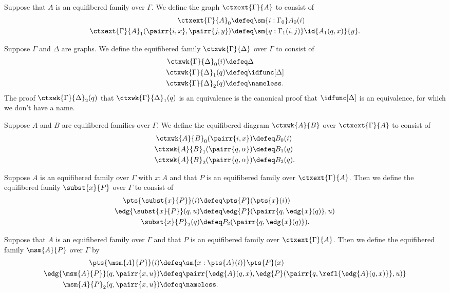 \begin{defn}
Suppose that $A$ is an equifibered family over $\Gamma$. We define the graph
$\ctxext{\Gamma}{A}$ to consist of
\begin{align*}
\ctxext{\Gamma}{A}_0 & \defeq\sm{i:\Gamma_0}A_0(i)\\
\ctxext{\Gamma}{A}_1(\pairr{i,x},\pairr{j,y}) & \defeq \sm{q:\Gamma_1(i,j)}\id{A_1(q,x)}{y}.
\end{align*}
\end{defn}

\begin{defn}
Suppose $\Gamma$ and $\Delta$ are graphs. We define the equifibered family
$\ctxwk{\Gamma}{\Delta}$ over $\Gamma$ to consist of
\begin{align*}
\ctxwk{\Gamma}{\Delta}_0(i) & \defeq \Delta\\
\ctxwk{\Gamma}{\Delta}_1(q) & \defeq \idfunc[\Delta]\\
\ctxwk{\Gamma}{\Delta}_2(q) & \defeq \nameless.
\end{align*}
The proof $\ctxwk{\Gamma}{\Delta}_2(q)$ that $\ctxwk{\Gamma}{\Delta}_1(q)$ is an
equivalence is the canonical proof that $\idfunc[\Delta]$ is an equivalence, for
which we don't have a name.
\end{defn}

\begin{defn}
Suppose $A$ and $B$ are equifibered families over $\Gamma$. We define the equifibered
diagram $\ctxwk{A}{B}$ over $\ctxext{\Gamma}{A}$ to consist of
\begin{align*}
\ctxwk{A}{B}_0(\pairr{i,x}) & \defeq B_0(i)\\
\ctxwk{A}{B}_1(\pairr{q,\alpha}) & \defeq B_1(q)\\
\ctxwk{A}{B}_2(\pairr{q,\alpha}) & \defeq B_2(q).
\end{align*}
\end{defn}

\begin{defn}
Suppose $A$ is an equifibered family over $\Gamma$ with $x:A$ and that $P$ is an equifibered
family over $\ctxext{\Gamma}{A}$. Then we define the equifibered family $\subst{x}{P}$
over $\Gamma$ to consist of
\begin{align*}
\pts{\subst{x}{P}}(i) & \defeq \pts{P}(\pts{x}(i))\\
\edg{\subst{x}{P}}(q,u) & \defeq \edg{P}(\pairr{q,\edg{x}(q)},u)\\
\subst{x}{P}_2(q) & \defeq P_2(\pairr{q,\edg{x}(q)}).
\end{align*}
\end{defn}

\begin{defn}
Suppose that $A$ is an equifibered family over $\Gamma$ and that $P$ is an
equifibered family over $\ctxext{\Gamma}{A}$. Then we define the equifibered
family $\msm{A}{P}$ over $\Gamma$ by
\begin{align*}
\pts{\msm{A}{P}}(i) & \defeq \sm{x:\pts{A}(i)}\pts{P}(x)\\
\edg{\msm{A}{P}}(q,\pairr{x,u}) & \defeq \pairr{\edg{A}(q,x),\edg{P}(\pairr{q,\refl{\edg{A}(q,x)}},u)}\\
\msm{A}{P}_2(q,\pairr{x,u}) & \defeq \nameless.
\end{align*}
\end{defn}

